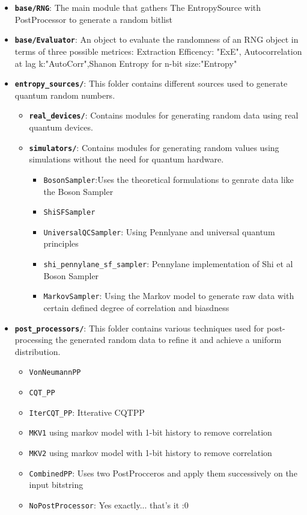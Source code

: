 \begin{itemize}
    \item \textbf{\texttt{base/RNG}}: The main module that gathers The EntropySource with PostProcessor to generate a random bitlist
    \item \textbf{\texttt{base/Evaluator}}: An object to evaluate the randomness of an RNG object in terms of three possible metrices: Extraction Efficency: "ExE", Autocorrelation at lag k:"AutoCorr",Shanon Entropy for n-bit size:"Entropy"
    \item \textbf{\texttt{entropy\_sources/}}: This folder contains different sources used to generate quantum random numbers.
    \begin{itemize}
        \item \textbf{\texttt{real\_devices/}}: Contains modules for generating random data using real quantum devices.
        
        \item \textbf{\texttt{simulators/}}: Contains modules for generating random values using simulations without the need for quantum hardware.
        \begin{itemize}
            \item \texttt{BosonSampler}:Uses the theoretical formulations to genrate data like the Boson Sampler
            \item \texttt{ShiSFSampler}
            \item \texttt{UniversalQCSampler}: Using Pennlyane and universal quantum principles
            \item \texttt{shi_pennylane_sf_sampler}: Pennylane implementation of Shi et al Boson Sampler \cite{shi_Twa3na}
            \item  \texttt{MarkovSampler}: Using the Markov model to generate raw data with certain defined degree of correlation and biasdness
        \end{itemize}
    \end{itemize}
    \item \textbf{\texttt{post\_processors/}}: This folder contains various techniques used for post-processing the generated random data to refine it and achieve a uniform distribution.
    \begin{itemize}
        \item \texttt{VonNeumannPP}
        \item \texttt{CQT\_PP}
        \item \texttt{IterCQT\_PP}: Itterative CQTPP
        \item \texttt{MKV1} using markov model with 1-bit history to remove correlation
        \item \texttt{MKV2} using markov model with 1-bit history to remove correlation
        \item \texttt{CombinedPP}: Uses two PostProcceros and apply them successively on the input bitstring
        \item \texttt{NoPostProcessor}: Yes exactly... that's it :0
    \end{itemize}
\end{itemize}


